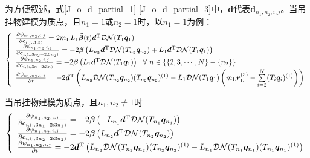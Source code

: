 为方便叙述，式\ref{J_o_d_partial_1}-\ref{J_o_d_partial_3}中，$\boldsymbol{d}$代表$\boldsymbol{d}_{n_1,n_2,i,j}$。当吊挂物建模为质点，且$n_1 = 1$或$n_2=1$时，以$n_1 = 1$为例：
\begin{equation}\label{J_o_d_partial_1}
    \left\{\begin{array}{l}
        \frac{\partial \psi_{n_1, n_2,i,j}}{\partial \boldsymbol{c}_{i,(:,1:3)}} = 2m_{\rm{L}}L_1\ddot{\boldsymbol{\beta}}(t) \boldsymbol{d}^{\rm{T}}\mathcal{DN}(T_1\boldsymbol{q}_1)\\
        \frac{\partial \psi_{ n_1, n_2,i,j}}{\partial \boldsymbol{c}_{i,(:,3n_2-2:3n_2)}} = -2 \boldsymbol{\beta} \left(
            L_{n_2}\boldsymbol{d}^{\rm{T}}\mathcal{DN}(T_{n_2}\boldsymbol{q}_{n_2}) + L_1 \boldsymbol{d}^{\rm{T}} \mathcal{DN}(T_1\boldsymbol{q}_1)
        \right)  \\
        \frac{\partial \psi_{n_1, n_2,i,j}}{\partial \boldsymbol{c}_{i,(:,3n-2:3n)}} = -2 \boldsymbol{\beta} \left(
             L_1 \boldsymbol{d}^{\rm{T}} \mathcal{DN}(T_1\boldsymbol{q}_1)
        \right) \,\,\,\, \forall \,\,  n \in \left\{\left\{ 2, 3, \cdots, N \right\} - \left\{n_2\right\}\right\} \\
        \frac{\partial \psi_{n_1, n_2,i,j}}{\partial t} = -2\boldsymbol{d}^{\rm{T}}\left(
             L_{n_2}\mathcal{DN}(T_{n_2}\boldsymbol{q}_{n_2})(T_{n_2}\boldsymbol{q}_{n_2})^{(1)}    
        - L_1\mathcal{DN}(T_1\boldsymbol{q}_1)\left(
                    m_{\rm{L}}\boldsymbol{r}_{\rm{L}}^{(3)}
                    -\sum\limits_{i=2}^N (T_i\boldsymbol{q}_i)^{(1)}
                \right)  
        \right)
    \end{array}
    \right.
\end{equation}

当吊挂物建模为质点，且$n_1, n_2 \ne 1$时
\begin{equation}\label{J_o_d_partial_2}
    \left\{\begin{array}{l}
        \frac{\partial \psi_{n_1, n_2,i,j}}{\partial \boldsymbol{c}_{i,(:,3n_1-2:3n_1)}} = -2 \boldsymbol{\beta} \left(
             -L_{n_1} \boldsymbol{d}^{\rm{T}} \mathcal{DN}(T_{n_1}\boldsymbol{q}_{n_1})
        \right)\\
        \frac{\partial \psi_{ n_1, n_2,i,j}}{\partial \boldsymbol{c}_{i,(:,3n_2-2:3n_2)}} = -2 \boldsymbol{\beta} \left(
            L_{n_2}\boldsymbol{d}^{\rm{T}}\mathcal{DN}(T_{n_2}\boldsymbol{q}_{n_2}) 
        \right)\\
        \frac{\partial \psi_{n_1, n_2,i,j}}{\partial t} = -2\boldsymbol{d}^{\rm{T}}\left(
            L_{n_2}\mathcal{DN}(T_{n_2}\boldsymbol{q}_{n_2})(T_{n_2}\boldsymbol{q}_{n_2})^{(1)}    
        - L_{n_1}\mathcal{DN}(T_{n_1}\boldsymbol{q}_{n_1})(T_{n_1}\boldsymbol{q}_{n_1})^{(1)} 
        \right)
    \end{array}
    \right.
\end{equation}

